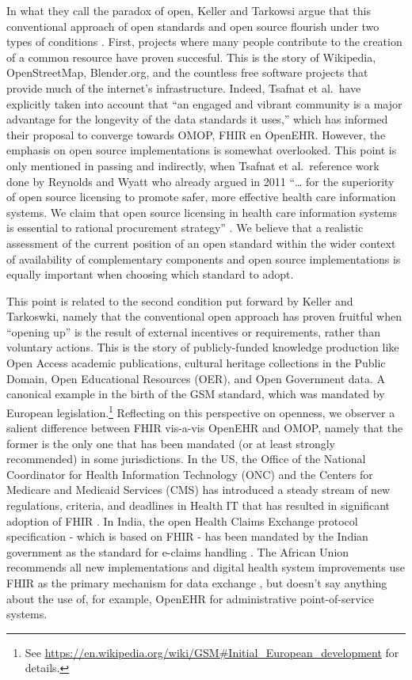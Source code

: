 \documentclass[
  authoryear]{elsarticle}
\begin{document}
In what they call the paradox of open, Keller and Tarkowsi argue that
this conventional approach of open standards and open source flourish
under two types of conditions \citep{keller2021paradox}. First, projects
where many people contribute to the creation of a common resource have
proven succesful. This is the story of Wikipedia, OpenStreetMap,
Blender.org, and the countless free software projects that provide much
of the internet's infrastructure. Indeed, Tsafnat et al.~have explicitly
taken into account that ``an engaged and vibrant community is a major
advantage for the longevity of the data standards it uses,'' which has
informed their proposal to converge towards OMOP, FHIR en OpenEHR.
However, the emphasis on open source implementations is somewhat
overlooked. This point is only mentioned in passing and indirectly, when
Tsafnat et al.~reference work done by Reynolds and Wyatt who already
argued in 2011 ``\ldots{} for the superiority of open source licensing
to promote safer, more effective health care information systems. We
claim that open source licensing in health care information systems is
essential to rational procurement strategy'' \citep{reynolds2011open}.
We believe that a realistic assessment of the current position of an
open standard within the wider context of availability of complementary
components and open source implementations is equally important when
choosing which standard to adopt.

This point is related to the second condition put forward by Keller and
Tarkoswki, namely that the conventional open approach has proven
fruitful when ``opening up'' is the result of external incentives or
requirements, rather than voluntary actions. This is the story of
publicly-funded knowledge production like Open Access academic
publications, cultural heritage collections in the Public Domain, Open
Educational Resources (OER), and Open Government data. A canonical
example in the birth of the GSM standard, which was mandated by European
legislation.\footnote{See
  \url{https://en.wikipedia.org/wiki/GSM\#Initial_European_development}
  for details.} Reflecting on this perspective on openness, we observer
a salient difference between FHIR vis-a-vis OpenEHR and OMOP, namely
that the former is the only one that has been mandated (or at least
strongly recommended) in some jurisdictions. In the US, the Office of
the National Coordinator for Health Information Technology (ONC) and the
Centers for Medicare and Medicaid Services (CMS) has introduced a steady
stream of new regulations, criteria, and deadlines in Health IT that has
resulted in significant adoption of FHIR \citep{firely2023fhir}. In
India, the open Health Claims Exchange protocol specification - which is
based on FHIR - has been mandated by the Indian government as the
standard for e-claims handling
\citep{nationalhealthauthority2020national, hcx}. The African Union
recommends all new implementations and digital health system
improvements use FHIR as the primary mechanism for data exchange
\citep{tilahun2023african}, but doesn't say anything about the use of,
for example, OpenEHR for administrative point-of-service systems.
\end{document}
